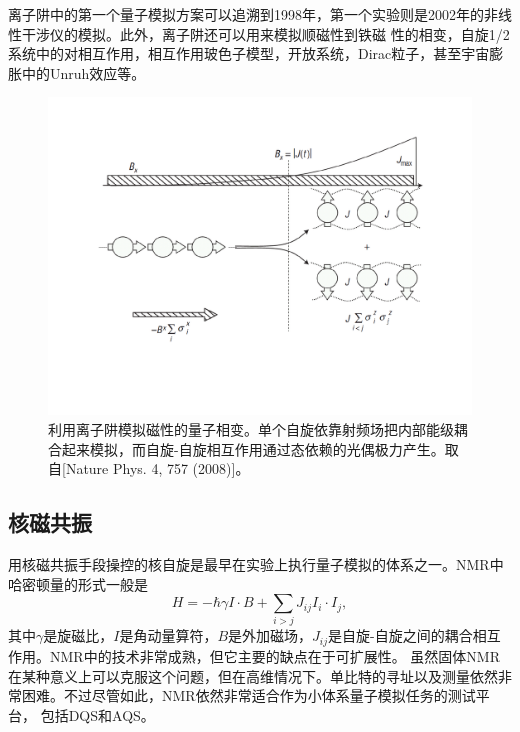 离子阱中的第一个量子模拟方案可以追溯到1998年\cite{ionsim1}，第一个实验则是2002年的非线性干涉仪的模拟\cite{ionsim2}。此外，离子阱还可以用来模拟顺磁性到铁磁
性的相变\cite{ionphase}，自旋1/2系统中的对相互作用\cite{ionsim3}，相互作用玻色子模型\cite{ionsim4}，开放系统\cite{ionsim5}，Dirac粒子\cite{dirac}，甚至宇宙膨胀中的Unruh效应\cite{unruh}等。

\begin{figure}[htbp]
            \begin{center}
              \includegraphics[width= 0.8\columnwidth]{figures/ionsim.pdf}
              \caption{利用离子阱模拟磁性的量子相变。单个自旋依靠射频场把内部能级耦合起来模拟，而自旋-自旋相互作用通过态依赖的光偶极力产生。取自[Nature Phys. 4, 757 (2008)\cite{ionphase}]。
              }
              \label{ionsim}
            \end{center}
        \end{figure}

\subsection{核磁共振}

用核磁共振手段操控的核自旋是最早在实验上执行量子模拟的体系之一。NMR中哈密顿量的形式一般是
 \begin{equation}\label{ion}
 H = -\hbar \gamma I\cdot B+\sum_{i>j}J_{ij} I_i \cdot I_j,
\end{equation}
其中$\gamma$是旋磁比，$I$是角动量算符，$B$是外加磁场，$J_{ij}$是自旋-自旋之间的耦合相互作用。NMR中的技术非常成熟，但它主要的缺点在于可扩展性。
虽然固体NMR在某种意义上可以克服这个问题，但在高维情况下。单比特的寻址以及测量依然非常困难。不过尽管如此，NMR依然非常适合作为小体系量子模拟任务的测试平台，
包括DQS和AQS。

